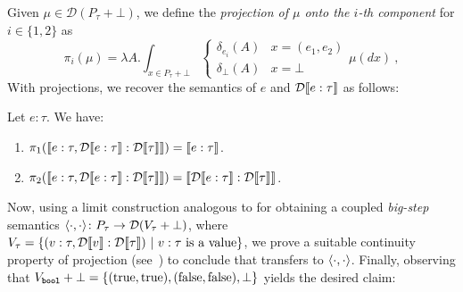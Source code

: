 Given $\mu \in \mathcal{D}(P_\tau + \bot)$, we define the \emph{projection of $\mu$ onto the $i$-th component} for $i\in\{ 1,2 \}$ as
%
\[
	\pi_i(\mu) = \lambda A. \int_{x \in P_\tau + \bot} 
	\begin{cases}
		 \delta_{e_i}(A) & x = (e_1,e_2)  \\
		 \delta_\bot(A)  & x = \bot
	\end{cases}
	\mu(dx)~,
\]
%
With projections, we recover the semantics of $e$ and $\mathcal{D}\llbracket e:\tau \rrbracket$ as follows:
\begin{lemma}
	\label{lem:maintext:small_step_coupling_props}
	Let $e:\tau$. We have:
	\begin{enumerate}
		\item\label{lem:maintext:small_step_coupling_props1} 
		$\pi_1(\llbracket e:\tau, \mathcal{D}\llbracket e : \tau \rrbracket : \mathcal{D}\llbracket \tau \rrbracket \rrbracket) = \llbracket e:\tau \rrbracket$.
		\item\label{lem:maintext:small_step_coupling_props2} 
		$\pi_2(\llbracket e:\tau, \mathcal{D}\llbracket e : \tau \rrbracket : \mathcal{D}\llbracket \tau \rrbracket \rrbracket) = \llbracket \mathcal{D}\llbracket e : \tau \rrbracket:\mathcal{D}\llbracket \tau \rrbracket \rrbracket$.
	\end{enumerate}
\end{lemma}
%

Now, using a limit construction analogous to  for obtaining a coupled \emph{big-step} semantics $\langle \cdot,\cdot \rangle \colon P_\tau \to \mathcal{D}(V_\tau + \bot)$, where $V_\tau = \{ (v:\tau, \mathcal{D}\llbracket v \rrbracket : \mathcal{D}\llbracket \tau \rrbracket) ~|~ v:\tau~\text{is a value} \}$, we prove a suitable continuity property of projection (see~\cite[Lemma~F.55]{Wu2026SliceExtended}) to conclude that  transfers to $\langle \cdot,\cdot \rangle$. Finally, observing that $V_{\textnormal{\ttfamily\bfseries bool}} + \bot = \{(\textnormal{true},\textnormal{true}), (\textnormal{false},\textnormal{false}), \bot\}$ yields the desired claim:

